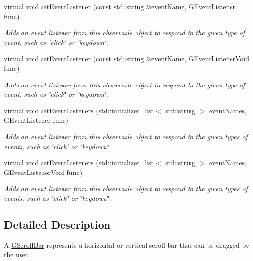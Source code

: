 \begin{DoxyCompactItemize}
virtual void \mbox{\hyperlink{classGObservable_ad2f6d34961c50f6c1e0659990b79f741}{set\+Event\+Listener}} (const std\+::string \&event\+Name, G\+Event\+Listener func)
\begin{DoxyCompactList}\small\item\em Adds an event listener from this observable object to respond to the given type of event, such as \char`\"{}click\char`\"{} or \char`\"{}keydown\char`\"{}. \end{DoxyCompactList}\item 
virtual void \mbox{\hyperlink{classGObservable_abac4cb9f9e626e010e87f5d91573c8a5}{set\+Event\+Listener}} (const std\+::string \&event\+Name, G\+Event\+Listener\+Void func)
\begin{DoxyCompactList}\small\item\em Adds an event listener from this observable object to respond to the given type of event, such as \char`\"{}click\char`\"{} or \char`\"{}keydown\char`\"{}. \end{DoxyCompactList}\item 
virtual void \mbox{\hyperlink{classGObservable_afa388d69c33c718cf035774604065604}{set\+Event\+Listeners}} (std\+::initializer\+\_\+list$<$ std\+::string $>$ event\+Names, G\+Event\+Listener func)
\begin{DoxyCompactList}\small\item\em Adds an event listener from this observable object to respond to the given types of events, such as \char`\"{}click\char`\"{} or \char`\"{}keydown\char`\"{}. \end{DoxyCompactList}\item 
virtual void \mbox{\hyperlink{classGObservable_a7867184bbb686f74fae8a4db927da799}{set\+Event\+Listeners}} (std\+::initializer\+\_\+list$<$ std\+::string $>$ event\+Names, G\+Event\+Listener\+Void func)
\begin{DoxyCompactList}\small\item\em Adds an event listener from this observable object to respond to the given types of events, such as \char`\"{}click\char`\"{} or \char`\"{}keydown\char`\"{}. \end{DoxyCompactList}\end{DoxyCompactItemize}


\subsection{Detailed Description}
A \mbox{\hyperlink{classGScrollBar}{G\+Scroll\+Bar}} represents a horizontal or vertical scroll bar that can be dragged by the user. 

